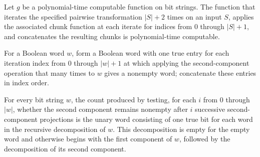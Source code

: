 \begin{theorem}
\label{Complexity.BinArith.polyTimeComputable_zipWithW}
\leanok
{}
Let $g$ be a polynomial-time computable function on bit strings. The function that
iterates the specified pairwise transformation $|S|+2$ times on an input $S$, applies
the associated chunk function at each iterate for indices from $0$ through $|S|+1$, and
concatenates the resulting chunks is polynomial-time computable.
\end{theorem}

\begin{definition}
\label{Complexity.BinArith.countW}
\leanok
{}
For a Boolean word $w$, form a Boolean word with one true entry for each iteration index
from $0$ through $|w|+1$ at which applying the second-component operation that many
times to $w$ gives a nonempty word; concatenate these entries in index order.
\end{definition}

\begin{theorem}
\label{Complexity.BinArith.countW_eq}
\leanok
{}
For every bit string $w$, the count produced by testing, for each $i$ from $0$ through
$|w|$, whether the second component remains nonempty after $i$ successive
second-component projections is the unary word consisting of one true bit for each word
in the recursive decomposition of $w$. This decomposition is empty for the empty word
and otherwise begins with the first component of $w$, followed by the decomposition of
its second component.
\end{theorem}

